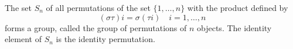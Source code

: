 The set $S_n$ of all permutations of the set $\{1, \ldots, n\}$ with the product defined by
$$(\sigma \tau)i = \sigma(\tau i) \quad i = 1, \ldots, n$$
forms a group, called the group of permutations of $n$ objects. The identity element of $S_n$ is the identity permutation.
